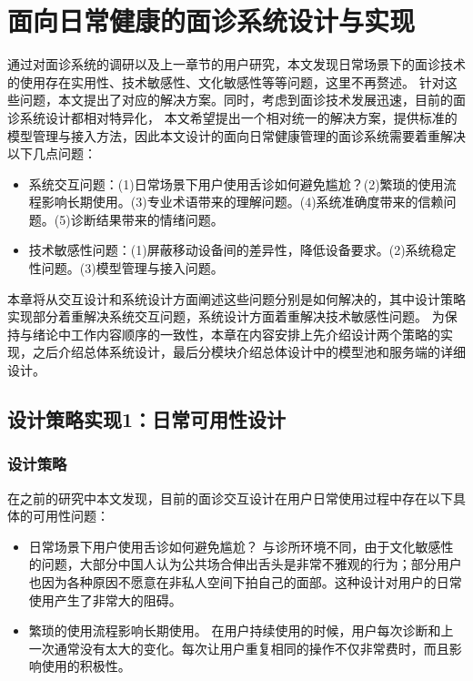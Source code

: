 \chapter{面向日常健康的面诊系统设计与实现}

通过对面诊系统的调研以及上一章节的用户研究，本文发现日常场景下的面诊技术的使用存在实用性、技术敏感性、文化敏感性等等问题，这里不再赘述。
针对这些问题，本文提出了对应的解决方案。同时，考虑到面诊技术发展迅速，目前的面诊系统设计都相对特异化，
本文希望提出一个相对统一的解决方案，提供标准的模型管理与接入方法，因此本文设计的面向日常健康管理的面诊系统需要着重解决以下几点问题：
\begin{itemize}
    \item 系统交互问题：(1)日常场景下用户使用舌诊如何避免尴尬？(2)繁琐的使用流程影响长期使用。(3)专业术语带来的理解问题。(4)系统准确度带来的信赖问题。(5)诊断结果带来的情绪问题。
    \item 技术敏感性问题：(1)屏蔽移动设备间的差异性，降低设备要求。(2)系统稳定性问题。(3)模型管理与接入问题。
\end{itemize}

本章将从交互设计和系统设计方面阐述这些问题分别是如何解决的，其中设计策略实现部分着重解决系统交互问题，系统设计方面着重解决技术敏感性问题。
为保持与绪论中工作内容顺序的一致性，本章在内容安排上先介绍设计两个策略的实现，之后介绍总体系统设计，最后分模块介绍总体设计中的模型池和服务端的详细设计。

\section{设计策略实现1：日常可用性设计}

\subsection{设计策略}
在之前的研究中本文发现，目前的面诊交互设计在用户日常使用过程中存在以下具体的可用性问题：
\begin{itemize}
    \item 日常场景下用户使用舌诊如何避免尴尬？
    与诊所环境不同，由于文化敏感性的问题，大部分中国人认为公共场合伸出舌头是非常不雅观的行为；部分用户也因为各种原因不愿意在非私人空间下拍自己的面部。这种设计对用户的日常使用产生了非常大的阻碍。
    \item 繁琐的使用流程影响长期使用。
    在用户持续使用的时候，用户每次诊断和上一次通常没有太大的变化。每次让用户重复相同的操作不仅非常费时，而且影响使用的积极性。
\end{itemize}

